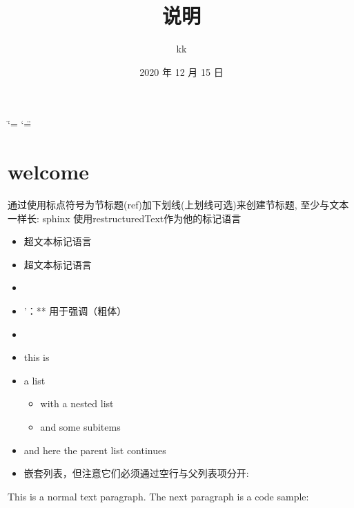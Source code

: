 \documentclass[letterpaper,10pt,english]{sphinxmanual}
\title{说明}
\date{2020 年 12 月 15 日}
\author{kk}
\begin{document}
\ifdefined\shorthandoff
  \ifnum\catcode`\=\string=\active\shorthandoff{=}\fi
  \ifnum\catcode`\"=\active{}\fi
\fi

\pagestyle{empty}
\sphinxmaketitle
\pagestyle{plain}
\sphinxtableofcontents
\pagestyle{normal}
\label{\detokenize{index::doc}}



\chapter{welcome}
\label{\detokenize{welcome:welcome}}\label{\detokenize{welcome::doc}}
通过使用标点符号为节标题(ref)加下划线(上划线可选)来创建节标题, 至少与文本一样长:
sphinx 使用restructuredText作为他的标记语言
\begin{itemize}
\item {} 
 超文本标记语言

\item {} 
 超文本标记语言

\item {} 
 

\item {} 
’：** 用于强调（粗体）

\item {} 

\end{itemize}
\begin{itemize}
\item {} 
this is

\item {} 
a list
\begin{itemize}
\item {} 
with a nested list

\item {} 
and some subitems

\end{itemize}

\item {} 
and here the parent list continues

\item {} 
嵌套列表，但注意它们必须通过空行与父列表项分开:

\end{itemize}

This is a normal text paragraph. The next paragraph is a code sample:
\end{document}

